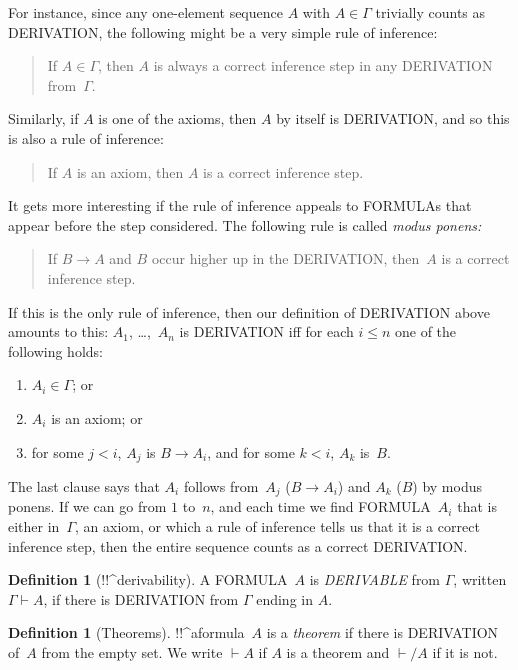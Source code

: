 \documentclass[10pt,a4paper]{article}
\newcommand*{\olup}[1]{\MakeUppercase{#1}}
\theoremstyle{plain}
\theoremstyle{definition}
\newtheorem{defn}[thm]{Definition}
\theoremstyle{remark}
\providecommand{\lif}{\mathbin{\rightarrow}}
\providecommand{\Proves}{\mathrel{\vdash}}
\begin{document}
For instance, since any one-element sequence $A$ with $A \in \Gamma$
trivially counts as \olup{derivation}, the following might be a very
simple rule of inference:
\begin{quote}
  If $A \in \Gamma$, then $A$ is always a correct inference step in
  any \olup{derivation} from~$\Gamma$.
\end{quote}
Similarly, if $A$ is one of the axioms, then $A$ by itself is
\olup{derivation}, and so this is also a rule of inference:
\begin{quote}
  If $A$ is an axiom, then $A$ is a correct inference step.
\end{quote}
It gets more interesting if the rule of inference appeals to
\olup{formula}s that appear before the step considered. The following
rule is called \emph{modus ponens:}
\begin{quote}
  If $B \lif A$ and $B$ occur higher up in the \olup{derivation},
  then~$A$ is a correct inference step.
\end{quote}
If this is the only rule of inference, then our definition of
\olup{derivation} above amounts to this: $A_1$, \dots,~$A_n$ is
\olup{derivation} iff for each $i \le n$ one of the following holds:
\begin{enumerate}
\item $A_i \in \Gamma$; or
\item $A_i$ is an axiom; or
\item for some $j < i$, $A_j$ is $B \lif A_i$, and for some $k < i$,
  $A_k$ is~$B$.
\end{enumerate}
The last clause says that $A_i$ follows from~$A_j$ ($B \lif A_i$) and $A_k$
($B$) by modus ponens. If we can go from $1$ to~$n$, and
each time we find \olup{formula}~$A_i$ that is either in~$\Gamma$, an
axiom, or which a rule of inference tells us that it is a correct
inference step, then the entire sequence counts as a correct
\olup{derivation}.

\begin{defn}[!!^{derivability}]
A \olup{formula}~$A$ is \emph{\olup{derivable}} from $\Gamma$, written
$\Gamma \Proves A$, if there is \olup{derivation} from $\Gamma$ ending
in $A$.
\end{defn}

\begin{defn}[Theorems]
!!^a{formula}~$A$ is a \emph{theorem} if there is \olup{derivation}
of~$A$ from the empty set.  We write $\Proves A$ if $A$ is a
theorem and $\Proves/ A$ if it is not.
\end{defn}
\end{document}
